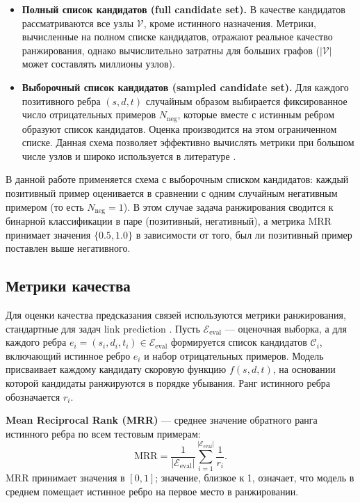 \documentclass[a4paper,12pt]{extarticle}
\begin{document}
\begin{itemize}
    \item \textbf{Полный список кандидатов (full candidate set).} В качестве кандидатов рассматриваются все узлы $\mathcal{V}$, кроме истинного назначения. Метрики, вычисленные на полном списке кандидатов, отражают реальное качество ранжирования, однако вычислительно затратны для больших графов ($|\mathcal{V}|$ может составлять миллионы узлов).

    \item \textbf{Выборочный список кандидатов (sampled candidate set).} Для каждого позитивного ребра $(s, d, t)$ случайным образом выбирается фиксированное число отрицательных примеров $N_{\text{neg}}$, которые вместе с истинным ребром образуют список кандидатов. Оценка производится на этом ограниченном списке. Данная схема позволяет эффективно вычислять метрики при большом числе узлов и широко используется в литературе \cite{poursafaei2022towards}.
\end{itemize}

В данной работе применяется схема с выборочным списком кандидатов: каждый позитивный пример оценивается в сравнении с одним случайным негативным примером (то есть $N_{\text{neg}} = 1$). В этом случае задача ранжирования сводится к бинарной классификации в паре (позитивный, негативный), а метрика MRR принимает значения $\{0.5, 1.0\}$ в зависимости от того, был ли позитивный пример поставлен выше негативного.

\subsection{Метрики качества}

Для оценки качества предсказания связей используются метрики ранжирования, стандартные для задач link prediction \cite{bordes2013translating}. Пусть $\mathcal{E}_{\text{eval}}$ — оценочная выборка, а для каждого ребра $e_i = (s_i, d_i, t_i) \in \mathcal{E}_{\text{eval}}$ формируется список кандидатов $\mathcal{C}_i$, включающий истинное ребро $e_i$ и набор отрицательных примеров. Модель присваивает каждому кандидату скоровую функцию $f(s, d, t)$, на основании которой кандидаты ранжируются в порядке убывания. Ранг истинного ребра обозначается $r_i$.

\textbf{Mean Reciprocal Rank (MRR)} — среднее значение обратного ранга истинного ребра по всем тестовым примерам:
\[
\text{MRR} = \frac{1}{|\mathcal{E}_{\text{eval}}|} \sum_{i=1}^{|\mathcal{E}_{\text{eval}}|} \frac{1}{r_i}.
\]
MRR принимает значения в $[0, 1]$; значение, близкое к 1, означает, что модель в среднем помещает истинное ребро на первое место в ранжировании.
\end{document}
